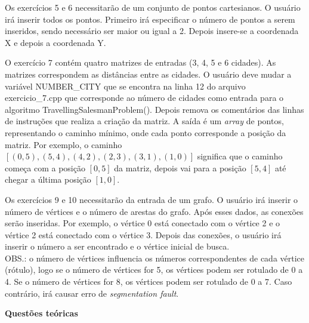 \documentclass[12pt,a4paper]{article}
\begin{document}
Os exercícios 5 e 6 necessitarão de um conjunto de pontos cartesianos. O usuário irá inserir todos os pontos. Primeiro irá especificar o número de pontos a serem inseridos, sendo necessário ser maior ou igual a 2. Depois insere-se a coordenada X e depois a coordenada Y. 

O exercício 7 contém quatro matrizes de entradas (3, 4, 5 e 6 cidades). As matrizes correspondem as distâncias entre as cidades. O usuário deve mudar a variável \textsf{NUMBER\_CITY} que se encontra na linha 12 do arquivo \textsf{exercicio\_7.cpp} que corresponde ao número de cidades como entrada para o algoritmo \textsf{TravellingSalesmanProblem()}. Depois remova os comentários das linhas de instruções que realiza a criação da matriz. A saída é um \textit{array} de pontos, representando o caminho mínimo, onde cada ponto corresponde a posição da matriz. Por exemplo, o caminho $[(0,5),(5,4),(4,2),(2,3),(3,1),(1,0)]$ significa que o caminho começa com a posição $[0,5]$ da matriz, depois vai para a posição $[5,4]$ até chegar a última posição $[1,0]$.

Os exercícios 9 e 10 necessitarão da entrada de um grafo. O usuário irá inserir o número de vértices e o número de arestas do grafo. Após esses dados, as conexões serão inseridas. Por exemplo, o vértice 0 está conectado com o vértice 2 e o vértice 2 está conectado com o vértice 3. Depois das conexões, o usuário irá inserir o número a ser encontrado e o vértice inicial de busca. \\
OBS.: o número de vértices influencia os números correspondentes de cada vértice (rótulo), logo se o número de vértices for 5, os vértices podem ser rotulado de 0 a 4. Se o número de vértices for 8, os vértices podem ser rotulado de 0 a 7. Caso contrário, irá causar erro de \textit{segmentation fault}.





\vspace{1cm}

{\Large \textbf{Questões teóricas}}
\end{document}
